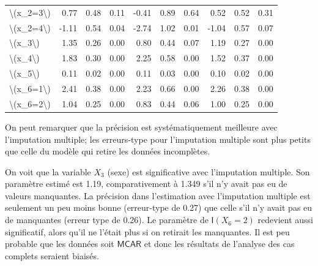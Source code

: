 \documentclass[
  11pt,
  letterpaper,
]{scrbook}
\theoremstyle{definition}
\theoremstyle{remark}
\begin{document}
\begin{longtable}[t]{lrccrccrcc}
\textbackslash{}(x\_2=3\textbackslash{}) & 0.77 & 0.48 & 0.11 & -0.41 & 0.89 & 0.64 & 0.52 & 0.52 & 0.31\\
\textbackslash{}(x\_2=4\textbackslash{}) & -1.11 & 0.54 & 0.04 & -2.74 & 1.02 & 0.01 & -1.04 & 0.57 & 0.07\\
\textbackslash{}(x\_3\textbackslash{}) & 1.35 & 0.26 & 0.00 & 0.80 & 0.44 & 0.07 & 1.19 & 0.27 & 0.00\\
\addlinespace
\textbackslash{}(x\_4\textbackslash{}) & 1.83 & 0.30 & 0.00 & 2.25 & 0.58 & 0.00 & 1.52 & 0.37 & 0.00\\
\textbackslash{}(x\_5\textbackslash{}) & 0.11 & 0.02 & 0.00 & 0.11 & 0.03 & 0.00 & 0.10 & 0.02 & 0.00\\
\textbackslash{}(x\_6=1\textbackslash{}) & 2.41 & 0.38 & 0.00 & 2.23 & 0.66 & 0.00 & 2.26 & 0.38 & 0.00\\
\textbackslash{}(x\_6=2\textbackslash{}) & 1.04 & 0.25 & 0.00 & 0.83 & 0.44 & 0.06 & 1.00 & 0.25 & 0.00\\
\bottomrule

\end{longtable}

On peut remarquer que la précision est systématiquement meilleure avec
l'imputation multiple; les erreurs-type pour l'imputation multiple sont
plus petits que celle du modèle qui retire les données incomplètes.

On voit que la variable \(X_3\) (sexe) est significative avec
l'imputation multiple. Son paramètre estimé est 1.19, comparativement à
1.349 s'il n'y avait pas eu de valeurs manquantes. La précision dans
l'estimation avec l'imputation multiple est seulement un peu moins bonne
(erreur-type de 0.27) que celle s'il n'y avait pas eu de manquantes
(erreur type de 0.26). Le paramètre de \(\mathsf{I}(X_6=2)\) redevient
aussi significatif, alors qu'il ne l'était plus si on retirait les
manquantes. Il est peu probable que les données soit \(\mathsf{MCAR}\)
et donc les résultats de l'analyse des cas complets seraient biaisés.
\end{document}
